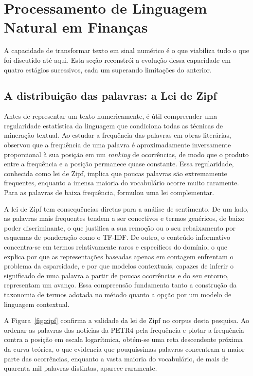 \section{Processamento de Linguagem Natural em Finanças}

A capacidade de transformar texto em sinal numérico é o que viabiliza tudo o que foi discutido até aqui. Esta seção reconstrói a evolução dessa capacidade em quatro estágios sucessivos, cada um superando limitações do anterior.

\subsection{A distribuição das palavras: a Lei de Zipf}

Antes de representar um texto numericamente, é útil compreender uma regularidade estatística da linguagem que condiciona todas as técnicas de mineração textual. Ao estudar a frequência das palavras em obras literárias,  observou que a frequência de uma palavra é aproximadamente inversamente proporcional à sua posição em um \textit{ranking} de ocorrências, de modo que o produto entre a frequência e a posição permanece quase constante. Essa regularidade, conhecida como lei de Zipf, implica que poucas palavras são extremamente frequentes, enquanto a imensa maioria do vocabulário ocorre muito raramente. Para as palavras de baixa frequência,  formulou uma lei complementar.

A lei de Zipf tem consequências diretas para a análise de sentimento. De um lado, as palavras mais frequentes tendem a ser conectivos e termos genéricos, de baixo poder discriminante, o que justifica a sua remoção ou o seu rebaixamento por esquemas de ponderação como o TF-IDF. De outro, o conteúdo informativo concentra-se em termos relativamente raros e específicos do domínio, o que explica por que as representações baseadas apenas em contagem enfrentam o problema da esparsidade, e por que modelos contextuais, capazes de inferir o significado de uma palavra a partir de poucas ocorrências e do seu entorno, representam um avanço. Essa compreensão fundamenta tanto a construção da taxonomia de termos adotada no método quanto a opção por um modelo de linguagem contextual.

A Figura~\ref{fig:zipf} confirma a validade da lei de Zipf no corpus desta pesquisa. Ao ordenar as palavras das notícias da PETR4 pela frequência e plotar a frequência contra a posição em escala logarítmica, obtém-se uma reta descendente próxima da curva teórica, o que evidencia que pouquíssimas palavras concentram a maior parte das ocorrências, enquanto a vasta maioria do vocabulário, de mais de quarenta mil palavras distintas, aparece raramente.

